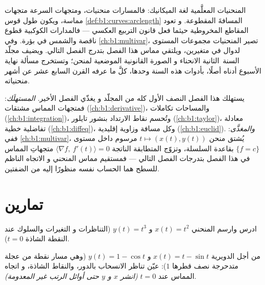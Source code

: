 \begin{remark}
\label{rem:b1:curves:whereused}
المنحنيات المعلَّمية لغة الميكانيك: فالمسارات
منحنيات، ومتجهات السرعة متجهات مماسة، ويكون طول
قوس \cref{def:b1:curves:arclength} المسافةَ المقطوعة. و
تعود المقاطع المخروطية حيثما فعل قانون التربيع العكسي --- فالمدارات
الكوكبية قطوع ناقصة والشمس في بؤرة. وفي
\cref{ch:b1:multivar}، تصير المنحنيات مجموعات المستوى لدوال
في متغيرين، ويلتقي مماس هذا الفصل
بتدرج الفصل التالي. ويضيف مجلّد السنة~الثانية الانحناء و
الصورة القانونية الموضعية لمنحن؛ وتستخرج مسألة نهاية الأسبوع أدناه
أصلًا، بأدوات هذه السنة وحدها، كلَّ ما عرفه
القرن السابع عشر عن أشهر منحنياته.
\end{remark}

\begin{remark}
\label{rem:b1:curves:perspectives}
يستهلك هذا الفصل النصف الأول كله من المجلّد و
يغذّي الفصل الأخير. \emph{المستهلَك}: فمتجهات المماس
مشتقات (\cref{ch:b1:derivative})،  والمساحات
تكاملات (\cref{ch:b1:integration})، وتُحسم نقاط الارتداد
بنشور تايلور (\cref{ch:b1:taylor})، 
معادلة تفاضلية خطية (\cref{ch:b1:diffeq})، وكل
مسافة وزاوية إقليدية (\cref{ch:b1:euclid}).
\emph{والمغذَّى}: ففي \cref{ch:b1:multivar}، يُشتق منحن $t \mapsto (x(t),
y(t))$ مرسوم داخل  مستوى $\{f = c\}$ بقاعدة
السلسلة، وتزوّج المتطابقة الناتجة $\langle \nabla f,\
f'(t)\rangle = 0$ متجهاتِ المماس في هذا الفصل بتدرجات
الفصل التالي --- فمستقيم مماس المنحني و
الاتجاه الناظم للسطح هما الحساب نفسه منظورًا إليه
من الضفتين.
\end{remark}

\section{تمارين}

\begin{exercise}[$\star$]\label{exo:b1:curves:1}
ادرس وارسم المنحني $x(t) = t^2$ و $y(t) = t^3$ (التناظرات و
التغيرات والسلوك عند النقطة الشاذة $t = 0$).
\end{exercise}

\begin{exercise}[$\star$]\label{exo:b1:curves:2}
من أجل الدويرية $x(t) = t - \sin t$ و $y(t) = 1 - \cos t$ (وهي
مسار نقطة من عجلة متدحرجة نصف قطرها $1$): عيّن
تناظر الانسحاب بالدور، والنقاط الشاذة، و
اتجاه المماس عند $t = 0$ \emph{(انشر $x$ و $y$ حتى أوائل
الرتب غير المعدومة)}.
\end{exercise}

